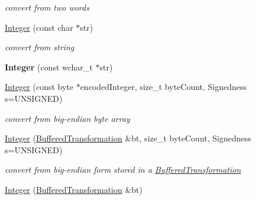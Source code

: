 \begin{DoxyCompactItemize}
\begin{DoxyCompactList}\small\item\em convert from two words \item\end{DoxyCompactList}\item 
\hyperlink{class_integer_a9e8bf8c72458dff4ceb5d6cdf9e5c97a}{Integer} (const char $\ast$str)
\begin{DoxyCompactList}\small\item\em convert from string \item\end{DoxyCompactList}\item 
\hypertarget{class_integer_a6931189bb0b2e68d04bef63bc6f172b3}{
{\bfseries Integer} (const wchar\_\-t $\ast$str)}
\label{class_integer_a6931189bb0b2e68d04bef63bc6f172b3}

\item 
\hypertarget{class_integer_a19c0d3273fcc216a5849527c7ba759d8}{
\hyperlink{class_integer_a19c0d3273fcc216a5849527c7ba759d8}{Integer} (const byte $\ast$encodedInteger, size\_\-t byteCount, Signedness s=UNSIGNED)}
\label{class_integer_a19c0d3273fcc216a5849527c7ba759d8}

\begin{DoxyCompactList}\small\item\em convert from big-\/endian byte array \item\end{DoxyCompactList}\item 
\hypertarget{class_integer_a39fee8047d003a1d6044da4b5025f3ce}{
\hyperlink{class_integer_a39fee8047d003a1d6044da4b5025f3ce}{Integer} (\hyperlink{class_buffered_transformation}{BufferedTransformation} \&bt, size\_\-t byteCount, Signedness s=UNSIGNED)}
\label{class_integer_a39fee8047d003a1d6044da4b5025f3ce}

\begin{DoxyCompactList}\small\item\em convert from big-\/endian form stored in a \hyperlink{class_buffered_transformation}{BufferedTransformation} \item\end{DoxyCompactList}\item 
\hypertarget{class_integer_a81d3973655b9f9d358de31ca4d0215c1}{
\hyperlink{class_integer_a81d3973655b9f9d358de31ca4d0215c1}{Integer} (\hyperlink{class_buffered_transformation}{BufferedTransformation} \&bt)}
\label{class_integer_a81d3973655b9f9d358de31ca4d0215c1}


\end{DoxyCompactItemize}

